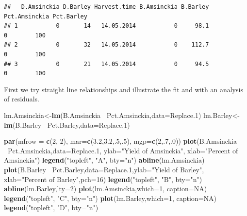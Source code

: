 \documentclass[letterpaper,]{book}
\newenvironment{Shaded}{\begin{snugshade}}{\end{snugshade}}
\newcommand{\DataTypeTok}[1]{\textcolor[rgb]{0.13,0.29,0.53}{#1}}
\newcommand{\DecValTok}[1]{\textcolor[rgb]{0.00,0.00,0.81}{#1}}
\newcommand{\FloatTok}[1]{\textcolor[rgb]{0.00,0.00,0.81}{#1}}
\newcommand{\KeywordTok}[1]{\textcolor[rgb]{0.13,0.29,0.53}{\textbf{#1}}}
\newcommand{\NormalTok}[1]{#1}
\newcommand{\OperatorTok}[1]{\textcolor[rgb]{0.81,0.36,0.00}{\textbf{#1}}}
\newcommand{\OtherTok}[1]{\textcolor[rgb]{0.56,0.35,0.01}{#1}}
\newcommand{\StringTok}[1]{\textcolor[rgb]{0.31,0.60,0.02}{#1}}
\begin{document}
\begin{verbatim}
##   D.Amsinckia D.Barley Harvest.time B.Amsinckia B.Barley Pct.Amsinckia Pct.Barley
## 1           0       14   14.05.2014           0     98.1             0        100
## 2           0       32   14.05.2014           0    112.7             0        100
## 3           0       21   14.05.2014           0     94.5             0        100
\end{verbatim}

First we try straight line relationships and illustrate the fit and with an analysis of residuals.



\begin{Shaded}
\begin{Highlighting}[]
\NormalTok{lm.Amsinckia<-}\KeywordTok{lm}\NormalTok{(B.Amsinckia }\OperatorTok{~}\NormalTok{Pct.Amsinckia,}\DataTypeTok{data=}\NormalTok{Replace}\FloatTok{.1}\NormalTok{)}
\NormalTok{lm.Barley<-}\KeywordTok{lm}\NormalTok{(B.Barley }\OperatorTok{~}\NormalTok{Pct.Barley,}\DataTypeTok{data=}\NormalTok{Replace}\FloatTok{.1}\NormalTok{)}

\KeywordTok{par}\NormalTok{(}\DataTypeTok{mfrow =} \KeywordTok{c}\NormalTok{(}\DecValTok{2}\NormalTok{, }\DecValTok{2}\NormalTok{), }\DataTypeTok{mar=}\KeywordTok{c}\NormalTok{(}\FloatTok{3.2}\NormalTok{,}\FloatTok{3.2}\NormalTok{,.}\DecValTok{5}\NormalTok{,.}\DecValTok{5}\NormalTok{), }\DataTypeTok{mgp=}\KeywordTok{c}\NormalTok{(}\DecValTok{2}\NormalTok{,.}\DecValTok{7}\NormalTok{,.}\DecValTok{0}\NormalTok{))}
\KeywordTok{plot}\NormalTok{(B.Amsinckia }\OperatorTok{~}\NormalTok{Pct.Amsinckia,}\DataTypeTok{data=}\NormalTok{Replace}\FloatTok{.1}\NormalTok{, }\DataTypeTok{ylab=}\StringTok{"Yield of Amsinckia"}\NormalTok{,}
     \DataTypeTok{xlab=}\StringTok{"Percent of Amsinckia"}\NormalTok{)}
  \KeywordTok{legend}\NormalTok{(}\StringTok{"topleft"}\NormalTok{, }\StringTok{"A"}\NormalTok{, }\DataTypeTok{bty=}\StringTok{"n"}\NormalTok{)}
\KeywordTok{abline}\NormalTok{(lm.Amsinckia)}
\KeywordTok{plot}\NormalTok{(B.Barley }\OperatorTok{~}\NormalTok{Pct.Barley,}\DataTypeTok{data=}\NormalTok{Replace}\FloatTok{.1}\NormalTok{,}\DataTypeTok{ylab=}\StringTok{"Yield of Barley"}\NormalTok{,}
     \DataTypeTok{xlab=}\StringTok{"Percent of Barley"}\NormalTok{,}\DataTypeTok{pch=}\DecValTok{16}\NormalTok{)}
  \KeywordTok{legend}\NormalTok{(}\StringTok{"topleft"}\NormalTok{, }\StringTok{"B"}\NormalTok{, }\DataTypeTok{bty=}\StringTok{"n"}\NormalTok{)}
\KeywordTok{abline}\NormalTok{(lm.Barley,}\DataTypeTok{lty=}\DecValTok{2}\NormalTok{)}
\KeywordTok{plot}\NormalTok{(lm.Amsinckia,}\DataTypeTok{which=}\DecValTok{1}\NormalTok{, }\DataTypeTok{caption=}\OtherTok{NA}\NormalTok{)}
  \KeywordTok{legend}\NormalTok{(}\StringTok{"topleft"}\NormalTok{, }\StringTok{"C"}\NormalTok{, }\DataTypeTok{bty=}\StringTok{"n"}\NormalTok{)}
\KeywordTok{plot}\NormalTok{(lm.Barley,}\DataTypeTok{which=}\DecValTok{1}\NormalTok{, }\DataTypeTok{caption=}\OtherTok{NA}\NormalTok{)}
  \KeywordTok{legend}\NormalTok{(}\StringTok{"topleft"}\NormalTok{, }\StringTok{"D"}\NormalTok{, }\DataTypeTok{bty=}\StringTok{"n"}\NormalTok{)}
\end{Highlighting}
\end{Shaded}
\end{document}
